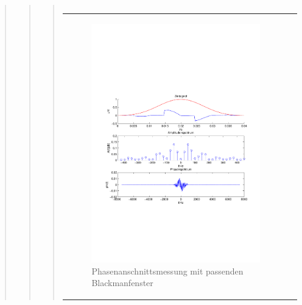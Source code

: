 \begin{quote}
\begin{quote}
\begin{quote}
\begin{center}
\begin{tabular}{ll}
                \end{tabular}
                \end{center}                
        
                \begin{center}
                \begin{tabular}{ll}
    
                \hspace{-11em}
                    \begin{minipage}{0.6\textwidth}
    
                        \begin{figure}[H]
                            \label{fig:}
                            \includegraphics[scale=0.4, trim = 1.5cm 7cm 1.5cm 8cm,
                            clip]{./Bilder/Phasenanschnittsmessungmitblackmanfenster} %
                            \caption{Phasenanschnittsmessung mit passenden Blackmanfenster}
                        \end{figure}
    

\end{minipage}
\end{tabular}
\end{center}
\end{quote}
\end{quote}
\end{quote}
